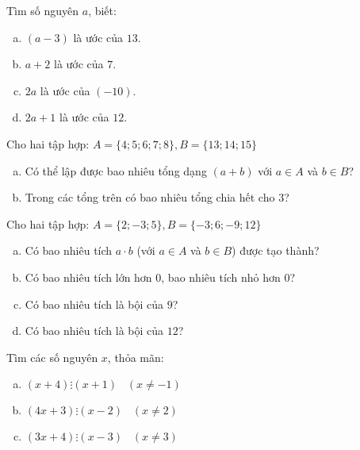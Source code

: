 \begin{bt}
\end{bt}   \begin{bt}
Tìm số nguyên $a$, biết:
\begin{enumerate}[a)]
\item $(a-3)$ là ước của $13$.
\item $a+2$ là ước của $7$.
\item $2a$ là ước của $(-10)$.
\item $2a+1$ là ước của $12$.
\end{enumerate}

\end{bt}   \begin{bt}
Cho hai tập hợp: $A= \{4; 5; 6; 7; 8 \}, B = \{13; 14; 15 \}$
\begin{enumerate}[a)]
\item Có thể lập được bao nhiêu tổng dạng $(a+b)$ với $a \in A$ và $b \in B$?
\item Trong các tổng trên có bao nhiêu tổng chia hết cho $3$?
\end{enumerate}


\end{bt}   \begin{bt}
Cho hai tập hợp: $A =\{ 2; -3; 5\}, B = \{ -3; 6; -9; 12\}$
\begin{enumerate}[a)]
\item Có bao nhiêu tích $a\cdot b$ (với $a \in A$ và $b \in B$) được tạo thành?
\item Có bao nhiêu tích lớn hơn $0$, bao nhiêu tích nhỏ hơn $0$?
\item Có bao nhiêu tích là bội của $9$?
\item Có bao nhiêu tích là bội của $12$?
\end{enumerate}

\end{bt}   \begin{bt}
Tìm các số nguyên $x$, thỏa mãn:
\begin{enumerate}[a)]
\item $(x+4) \vdots (x+1) \;\;\; (x \neq -1)$
\item $(4x+ 3) \vdots (x-2) \;\;\; (x \neq 2)$
\item $(3x+4) \vdots (x-3) \;\;\; (x \neq 3)$
\end{enumerate}
\end{bt}